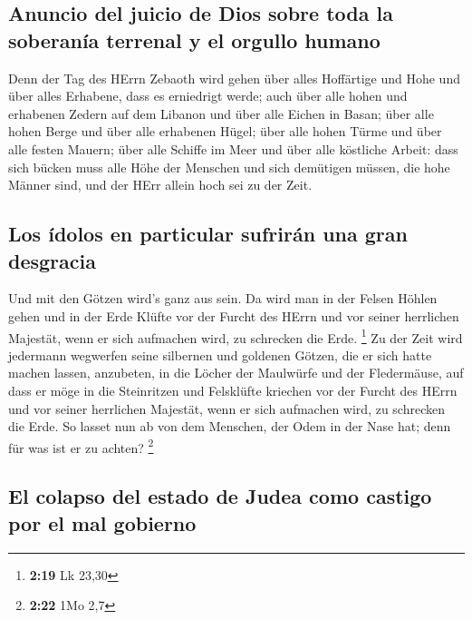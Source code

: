 \hypertarget{anuncio-del-juicio-de-dios-sobre-toda-la-soberanuxeda-terrenal-y-el-orgullo-humano}{%
\subsection{Anuncio del juicio de Dios sobre toda la soberanía terrenal
y el orgullo
humano}\label{anuncio-del-juicio-de-dios-sobre-toda-la-soberanuxeda-terrenal-y-el-orgullo-humano}}

 Denn der Tag des HErrn Zebaoth wird gehen über alles
Hoffärtige und Hohe und über alles Erhabene, dass es erniedrigt werde;
 auch über alle hohen und erhabenen Zedern auf dem
Libanon und über alle Eichen in Basan;  über alle hohen
Berge und über alle erhabenen Hügel;  über alle hohen
Türme und über alle festen Mauern;  über alle Schiffe im
Meer und über alle köstliche Arbeit:  dass sich bücken
muss alle Höhe der Menschen und sich demütigen müssen, die hohe Männer
sind, und der HErr allein hoch sei zu der Zeit.

\hypertarget{los-uxeddolos-en-particular-sufriruxe1n-una-gran-desgracia}{%
\subsection{Los ídolos en particular sufrirán una gran
desgracia}\label{los-uxeddolos-en-particular-sufriruxe1n-una-gran-desgracia}}

 Und mit den Götzen wird's ganz aus sein. 
Da wird man in der Felsen Höhlen gehen und in der Erde Klüfte vor der
Furcht des HErrn und vor seiner herrlichen Majestät, wenn er sich
aufmachen wird, zu schrecken die Erde. \footnote{\textbf{2:19} Lk 23,30}
 Zu der Zeit wird jedermann wegwerfen seine silbernen und
goldenen Götzen, die er sich hatte machen lassen, anzubeten, in die
Löcher der Maulwürfe und der Fledermäuse,  auf dass er
möge in die Steinritzen und Felsklüfte kriechen vor der Furcht des HErrn
und vor seiner herrlichen Majestät, wenn er sich aufmachen wird, zu
schrecken die Erde.  So lasset nun ab von dem Menschen,
der Odem in der Nase hat; denn für was ist er zu achten? \footnote{\textbf{2:22}
  1Mo 2,7}

\hypertarget{el-colapso-del-estado-de-judea-como-castigo-por-el-mal-gobierno}{%
\subsection{El colapso del estado de Judea como castigo por el mal
gobierno}\label{el-colapso-del-estado-de-judea-como-castigo-por-el-mal-gobierno}}

